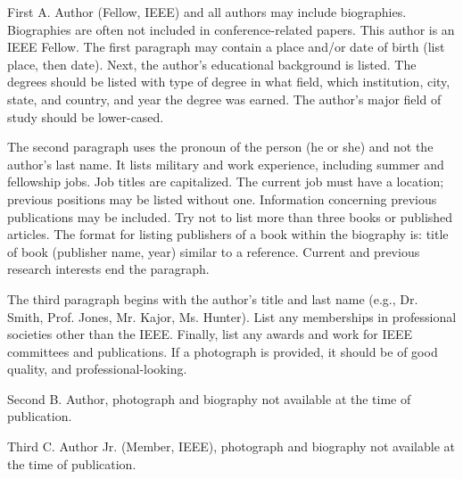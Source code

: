 \documentclass[journal,twoside,web]{ieeecolor}
\begin{document}
\begin{IEEEbiography}{First A. Author} (Fellow, IEEE) and all authors may include 
biographies. Biographies are
often not included in conference-related papers.
This author is an IEEE Fellow. The first paragraph
may contain a place and/or date of birth (list
place, then date). Next, the author’s educational
background is listed. The degrees should be listed
with type of degree in what field, which institution,
city, state, and country, and year the degree was
earned. The author’s major field of study should
be lower-cased.

The second paragraph uses the pronoun of the person (he or she) and
not the author’s last name. It lists military and work experience, including
summer and fellowship jobs. Job titles are capitalized. The current job must
have a location; previous positions may be listed without one. Information
concerning previous publications may be included. Try not to list more than
three books or published articles. The format for listing publishers of a book
within the biography is: title of book (publisher name, year) similar to a
reference. Current and previous research interests end the paragraph.

The third paragraph begins with the author’s title and last name (e.g.,
Dr. Smith, Prof. Jones, Mr. Kajor, Ms. Hunter). List any memberships in
professional societies other than the IEEE. Finally, list any awards and work
for IEEE committees and publications. If a photograph is provided, it should
be of good quality, and professional-looking.
\end{IEEEbiography}

\begin{IEEEbiographynophoto}{Second B. Author,} photograph and biography not available at the
time of publication.
\end{IEEEbiographynophoto}

\begin{IEEEbiographynophoto}{Third C. Author Jr.} (Member, IEEE), photograph and biography not available at the
time of publication.
\end{IEEEbiographynophoto}
\end{document}
